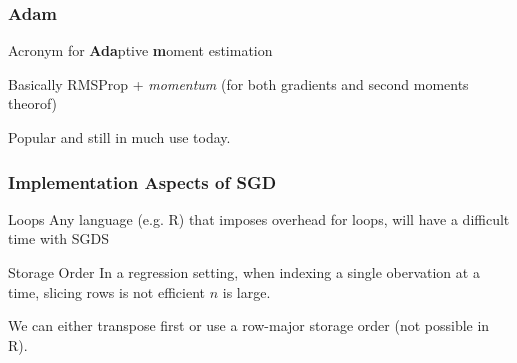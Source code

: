 \documentclass[aspectratio=1610,onlytextwidth]{beamer}
\begin{document}
\begin{frame}[c]
  \frametitle{Adam}

  Acronym for \textbf{Ada}ptive \textbf{m}oment estimation~\parencite{kingmaAdamMethodStochastic2015}

  \medskip

  Basically RMSProp + \emph{momentum} (for both gradients and second moments theorof)

  \medskip

  Popular and still in much use today.

\end{frame}

\begin{frame}[c]
  \frametitle{Implementation Aspects of SGD}

  \begin{block}{Loops}
    Any language (e.g. R) that imposes overhead for loops, will have a difficult time with SGDS
  \end{block}

  \pause

  \begin{block}{Storage Order}
    In a regression setting, when indexing a single obervation at a time, slicing rows is not efficient
    $n$ is large.

    \medskip

    We can either transpose first or use a row-major storage order (not possible in R).
  \end{block}
\end{frame}
\end{document}
